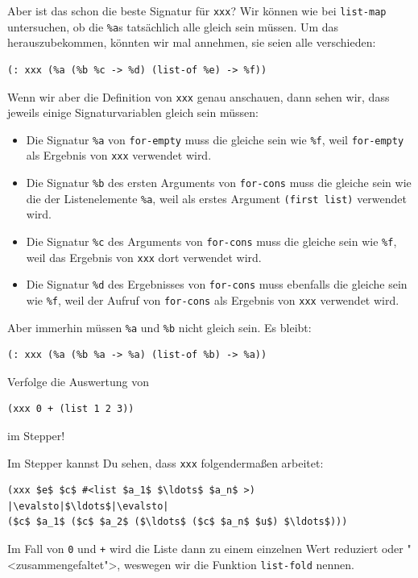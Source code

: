 Aber ist das schon die beste Signatur für \lstinline{xxx}?  Wir können
wie bei \lstinline{list-map} untersuchen, ob die \lstinline{%a}s
tatsächlich alle gleich sein müssen.  Um das herauszubekommen, könnten
wir mal annehmen, sie seien alle verschieden:
\begin{lstlisting}
(: xxx (%a (%b %c -> %d) (list-of %e) -> %f))
\end{lstlisting}
%
Wenn wir aber die Definition von \lstinline{xxx} genau anschauen, dann
sehen wir, dass jeweils einige Signaturvariablen gleich sein müssen:
%
\begin{itemize}
\item Die Signatur \lstinline{%a} von \lstinline{for-empty} muss die
  gleiche sein wie \lstinline{%f}, weil \lstinline{for-empty} als
  Ergebnis von \lstinline{xxx} verwendet wird.
\item Die Signatur \lstinline{%b} des ersten Arguments von
    \lstinline{for-cons} muss die gleiche sein wie die der
    Listenelemente \lstinline{%a}, weil als erstes Argument
      \lstinline{(first list)} verwendet wird.
\item Die Signatur \lstinline{%c} des Arguments von
    \lstinline{for-cons} muss die gleiche sein wie \lstinline{%f},
     weil das Ergebnis von \lstinline{xxx} dort verwendet wird.
\item Die Signatur \lstinline{%d} des Ergebnisses von
    \lstinline{for-cons} muss ebenfalls die gleiche sein wie
    \lstinline{%f}, weil der Aufruf von \lstinline{for-cons} als
    Ergebnis von \lstinline{xxx} verwendet wird.
\end{itemize}
%
Aber immerhin müssen \lstinline{%a} und \lstinline{%b} nicht gleich
sein.  Es bleibt:
%
\begin{lstlisting}
(: xxx (%a (%b %a -> %a) (list-of %b) -> %a))
\end{lstlisting}
%
\begin{aufgabeinline}
  Verfolge die Auswertung von
\begin{lstlisting}
(xxx 0 + (list 1 2 3))
\end{lstlisting}
  im Stepper!
\end{aufgabeinline}
%
Im Stepper kannst Du sehen, dass \lstinline{xxx} folgendermaßen
arbeitet:
%
\begin{lstlisting}
(xxx $e$ $c$ #<list $a_1$ $\ldots$ $a_n$ >)
|\evalsto|$\ldots$|\evalsto|
($c$ $a_1$ ($c$ $a_2$ ($\ldots$ ($c$ $a_n$ $u$) $\ldots$)))
\end{lstlisting}
%
Im Fall von \lstinline{0} und \lstinline{+} wird die Liste dann zu
einem einzelnen Wert reduziert oder "<zusammengefaltet">, weswegen wir
die Funktion \lstinline{list-fold} nennen.


